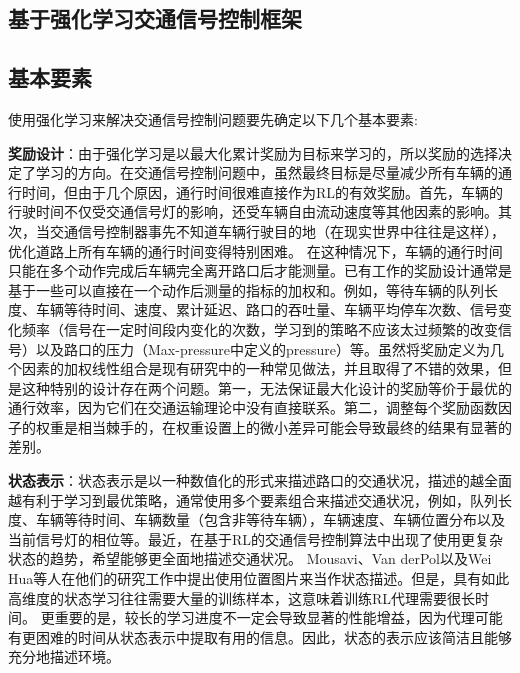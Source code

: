 \subsection{基于强化学习交通信号控制框架}

\subsection{基本要素}
使用强化学习来解决交通信号控制问题要先确定以下几个基本要素:

\textbf{奖励设计}：由于强化学习是以最大化累计奖励为目标来学习的，所以奖励的选择决定了学习的方向。在交通信号控制问题中，虽然最终目标是尽量减少所有车辆的通行时间，但由于几个原因，通行时间很难直接作为RL的有效奖励。首先，车辆的行驶时间不仅受交通信号灯的影响，还受车辆自由流动速度等其他因素的影响。其次，当交通信号控制器事先不知道车辆行驶目的地（在现实世界中往往是这样），优化道路上所有车辆的通行时间变得特别困难。 在这种情况下，车辆的通行时间只能在多个动作完成后车辆完全离开路口后才能测量。已有工作的奖励设计通常是基于一些可以直接在一个动作后测量的指标的加权和。例如，等待车辆的队列长度、车辆等待时间、速度、累计延迟、路口的吞吐量、车辆平均停车次数、信号变化频率（信号在一定时间段内变化的次数，学习到的策略不应该太过频繁的改变信号）以及路口的压力（Max-pressure中定义的pressure）等。虽然将奖励定义为几个因素的加权线性组合是现有研究中的一种常见做法，并且取得了不错的效果，但是这种特别的设计存在两个问题。第一，无法保证最大化设计的奖励等价于最优的通行效率，因为它们在交通运输理论中没有直接联系。第二，调整每个奖励函数因子的权重是相当棘手的，在权重设置上的微小差异可能会导致最终的结果有显著的差别。

\textbf{状态表示}：状态表示是以一种数值化的形式来描述路口的交通状况，描述的越全面越有利于学习到最优策略，通常使用多个要素组合来描述交通状况，例如，队列长度、车辆等待时间、车辆数量（包含非等待车辆），车辆速度、车辆位置分布以及当前信号灯的相位等。最近，在基于RL的交通信号控制算法中出现了使用更复杂状态的趋势，希望能够更全面地描述交通状况。 Mousavi、Van derPol以及Wei Hua等人在他们的研究工作中提出使用位置图片来当作状态描述。但是，具有如此高维度的状态学习往往需要大量的训练样本，这意味着训练RL代理需要很长时间。 更重要的是，较长的学习进度不一定会导致显著的性能增益，因为代理可能有更困难的时间从状态表示中提取有用的信息。因此，状态的表示应该简洁且能够充分地描述环境。

